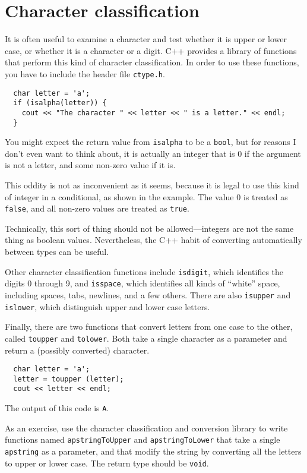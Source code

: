 \section{Character classification}

It is often useful to examine a character and test whether
it is upper or lower case, or whether it is a character or
a digit.  C++ provides a library of functions that perform
this kind of character classification.  In order to use these
functions, you have to include the header file {\tt ctype.h}.

\begin{verbatim}
  char letter = 'a';
  if (isalpha(letter)) {
    cout << "The character " << letter << " is a letter." << endl;
  }
\end{verbatim}
%
You might expect the return value from {\tt isalpha} to
be a {\tt bool}, but for reasons I don't even want to think
about, it is actually an integer that is
0 if the argument is not a letter, and some non-zero value
if it is.

This oddity is not as inconvenient as it seems, because it is
legal to use this kind of integer in a conditional, as shown
in the example.  The value 0 is treated as {\tt false}, and
all non-zero values are treated as {\tt true}.

Technically, this sort of thing should not be allowed---integers are
not the same thing as boolean values.  Nevertheless, the C++ habit of
converting automatically between types can be useful.

Other character classification functions include {\tt isdigit}, which
identifies the digits 0 through 9, and {\tt isspace}, which identifies
all kinds of ``white'' space, including spaces, tabs, newlines, and a
few others.  There are also {\tt isupper} and {\tt islower}, which
distinguish upper and lower case letters.

Finally, there are two functions that convert letters from one
case to the other, called {\tt toupper} and {\tt tolower}.  Both take
a single character as a parameter and return a (possibly
converted) character.

\begin{verbatim}
  char letter = 'a';
  letter = toupper (letter);
  cout << letter << endl;
\end{verbatim}
%
The output of this code is {\tt A}.

As an exercise, use the character classification and conversion
library to write functions named {\tt apstringToUpper} and
{\tt apstringToLower} that take a single {\tt apstring} as
a parameter, and that modify the string by converting all the
letters to upper or lower case.  The return type should be
{\tt void}.

